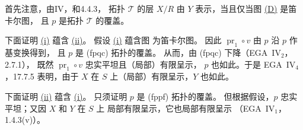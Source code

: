 首先注意，由IV，和4.4.3，
拓扑 \(\mathcal T\) 的层 \(X/R\) 由 \(Y\) 表示，当且仅当图
\hyperref[diag:sga3-VIB-10.8-D]{\textup{(D)}} 是笛卡尔图，
且 \(p\) 是拓扑 \(\mathcal T\) 的覆盖。

下面证明 \hyperref[concl:sga3-VIB-10.8-i]{\textup{(i)}} 蕴含
\hyperref[concl:sga3-VIB-10.8-ii]{\textup{(ii)}}。
假设 \hyperref[concl:sga3-VIB-10.8-i]{\textup{(i)}} 蕴含图
\hyperref[diag:sga3-VIB-10.8-D]%
{} 为笛卡尔图。
因此 \(\operatorname{pr}_1\circ v\) 由 \(p\) 沿 \(p\) 作基变换得到，
且 \(p\) 是 \textup{(fpqc)} 拓扑的覆盖。
从而，由 \textup{(fpqc)} 下降（EGA~IV\(_2\)，2.7.1），
既然 \(\operatorname{pr}_1\circ v\) 忠实平坦且\textup{（局部）}有限呈示，
\(p\) 也如此。于是 EGA~IV\(_4\)，17.7.5 表明，由于 \(X\)
在 \(S\) 上\textup{（局部）}有限呈示，\(Y\) 也如此。

下面证明 \hyperref[concl:sga3-VIB-10.8-ii]{\textup{(ii)}} 蕴含
\hyperref[concl:sga3-VIB-10.8-i]{\textup{(i)}}。
只须证明 \(p\) 是 \textup{(fppf)} 拓扑的覆盖。
但根据假设，\(p\) 忠实平坦；又因 \(X\) 和 \(Y\) 在 \(S\) 上
局部有限呈示，它也局部有限呈示
\textup{（EGA~IV\(_1\)，1.4.3\textup{(v)}）}。

